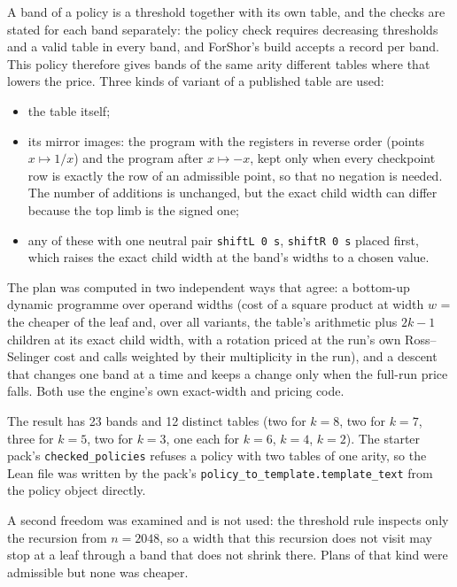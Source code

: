 \documentclass[11pt]{article}
\begin{document}
A band of a policy is a threshold together with its own table, and the checks are stated for each band
separately: the policy check requires decreasing thresholds and a valid table in every band, and ForShor's
build accepts a record per band. This policy therefore gives bands of the same arity different tables where
that lowers the price. Three kinds of variant of a published table are used:
\begin{itemize}
\item the table itself;
\item its mirror images: the program with the registers in reverse order (points $x \mapsto 1/x$) and the program
after $x \mapsto -x$, kept only when every checkpoint row is exactly the row of an admissible point, so that no
negation is needed. The number of additions is unchanged, but the exact child width can differ because the top
limb is the signed one;
\item any of these with one neutral pair \texttt{shiftL 0 s}, \texttt{shiftR 0 s} placed first, which raises the
exact child width at the band's widths to a chosen value.
\end{itemize}
The plan was computed in two independent ways that agree: a bottom-up dynamic programme over operand widths
(cost of a square product at width $w$ = the cheaper of the leaf and, over all variants, the table's arithmetic
plus $2k-1$ children at its exact child width, with a rotation priced at the run's own Ross--Selinger cost and
calls weighted by their multiplicity in the run), and a descent that changes one band at a time and keeps a
change only when the full-run price falls. Both use the engine's own exact-width and pricing code.

The result has 23 bands and 12 distinct tables (two for $k=8$, two for $k=7$, three for $k=5$, two for $k=3$,
one each for $k=6$, $k=4$, $k=2$). The starter pack's \texttt{checked\_policies} refuses a policy with two
tables of one arity, so the Lean file was written by the pack's \texttt{policy\_to\_template.template\_text}
from the policy object directly.

A second freedom was examined and is not used: the threshold rule inspects only the recursion from
$n = 2048$, so a width that this recursion does not visit may stop at a leaf through a band that does not
shrink there. Plans of that kind were admissible but none was cheaper.
\end{document}
